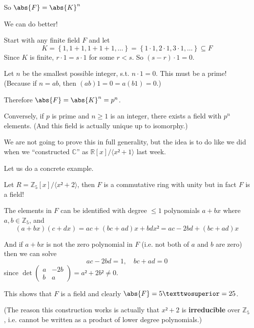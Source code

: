 \documentclass[english]{lbscript}
\begin{document}
So \(\abs{F}=\abs{K}^{n}\)

We can do better!

Start with any finite field \(F\) and let
\begin{equation}
	\label{eq:127}
	K=\left\{ 1, 1+1, 1+1+1, \dots \right\} = \left\{ 1⋅1, 2⋅1, 3⋅1, \dots \right\}  ⊆F
\end{equation}
Since \(K\) is finite, \(r⋅1=s⋅1\) for some \(r<s\). So \((s-r)⋅1=0\).

Let \(n\) be the smallest possible integer, s.t. \(n⋅1=0\). This must be a prime! (Because if \(n=ab\), then \((ab)1=0=a(b1)=0\).)

Therefore \(\abs{F}=\abs{K}^{n}=p^{n}\).

Conversely, if \(p\) is prime and \(n≥1\) is an integer, there exists a field with \(p^{n}\) elements. (And this field is actually unique up to isomorphy.)

We are not going to prove this in full generality, but the idea is to do like we did when we \enquote{constructed \(ℂ\)} as \(ℝ[x]/⟨x²+1⟩\) last week.

Let us do a concrete example.

\begin{example}{}{}
	Let \(R=ℤ_{5}[x]/⟨x²+2⟩\), then \(F\) is a commutative ring with unity but in fact \(F\) is a field!

	The elements in \(F\) can be identified with degree \(≤1\) polynomials \(a+bx\) where \(a,b∈ℤ_{5}\), and
	\begin{equation}
		\label{eq:128}
		(a+bx)(c+dx)=ac + (bc+ad)x + bdx² = ac - 2bd + (bc+ad)x
	\end{equation}

	And if \(a+bx\) is not the zero polynomial in \(F\) (i.e. not both of \(a\) and \(b\) are zero) then we can solve
	\begin{equation}
		\label{eq:129}
		ac-2bd = 1, \quad bc+ad=0
	\end{equation}
	since \(\det \begin{pmatrix} a  & -2b \\ b  & a \end{pmatrix} = a²+2b²≠0 \).

	This shows that \(F\) is a field and clearly \(\abs{F}=5²=25\).

	(The reason this construction works is actually that \(x²+2\) is \textbf{irreducible} over \(ℤ_{5}\), i.e. cannot be written as a product of lower degree polynomials.)
\end{example}
\end{document}
